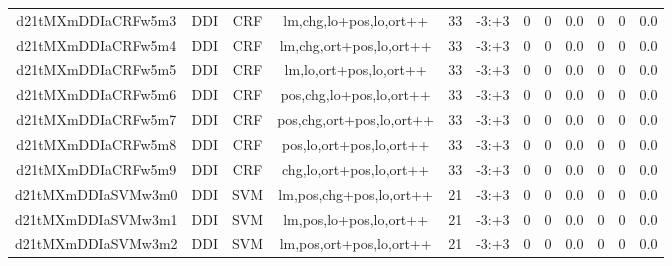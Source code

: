 \documentclass[a4paper]{article}
\begin{document}
\begin{landscape}
\begin{center}
\begin{tabular}{ |c|c|c|c|c|c|c|c|c|c|c|c|}
 
 	
 	\small{ d21tMXmDDIaCRFw5m3 } & \small{ DDI} & \small{  CRF }  & lm,chg,lo+pos,lo,ort++  &  33 &  \small{  -3:+3 }  &  0 & 0 & 0.0  &  0 & 0 & 0.0 \\
 	

 
 	
 	\small{ d21tMXmDDIaCRFw5m4 } & \small{ DDI} & \small{  CRF }  & lm,chg,ort+pos,lo,ort++  &  33 &  \small{  -3:+3 }  &  0 & 0 & 0.0  &  0 & 0 & 0.0 \\
 	

 
 	
 	\small{ d21tMXmDDIaCRFw5m5 } & \small{ DDI} & \small{  CRF }  & lm,lo,ort+pos,lo,ort++  &  33 &  \small{  -3:+3 }  &  0 & 0 & 0.0  &  0 & 0 & 0.0 \\
 	

 
 	
 	\small{ d21tMXmDDIaCRFw5m6 } & \small{ DDI} & \small{  CRF }  & pos,chg,lo+pos,lo,ort++  &  33 &  \small{  -3:+3 }  &  0 & 0 & 0.0  &  0 & 0 & 0.0 \\
 	

 
 	
 	\small{ d21tMXmDDIaCRFw5m7 } & \small{ DDI} & \small{  CRF }  & pos,chg,ort+pos,lo,ort++  &  33 &  \small{  -3:+3 }  &  0 & 0 & 0.0  &  0 & 0 & 0.0 \\
 	

 
 	
 	\small{ d21tMXmDDIaCRFw5m8 } & \small{ DDI} & \small{  CRF }  & pos,lo,ort+pos,lo,ort++  &  33 &  \small{  -3:+3 }  &  0 & 0 & 0.0  &  0 & 0 & 0.0 \\
 	

 
 	
 	\small{ d21tMXmDDIaCRFw5m9 } & \small{ DDI} & \small{  CRF }  & chg,lo,ort+pos,lo,ort++  &  33 &  \small{  -3:+3 }  &  0 & 0 & 0.0  &  0 & 0 & 0.0 \\
 	

 
 	
 	\small{ d21tMXmDDIaSVMw3m0 } & \small{ DDI} & \small{  SVM }  & lm,pos,chg+pos,lo,ort++  &  21 &  \small{  -3:+3 }  &  0 & 0 & 0.0  &  0 & 0 & 0.0 \\
 	

 
 	
 	\small{ d21tMXmDDIaSVMw3m1 } & \small{ DDI} & \small{  SVM }  & lm,pos,lo+pos,lo,ort++  &  21 &  \small{  -3:+3 }  &  0 & 0 & 0.0  &  0 & 0 & 0.0 \\
 	

 
 	
 	\small{ d21tMXmDDIaSVMw3m2 } & \small{ DDI} & \small{  SVM }  & lm,pos,ort+pos,lo,ort++  &  21 &  \small{  -3:+3 }  &  0 & 0 & 0.0  &  0 & 0 & 0.0 \\
 	


\end{tabular}
\end{center}
\end{landscape}
\end{document}
